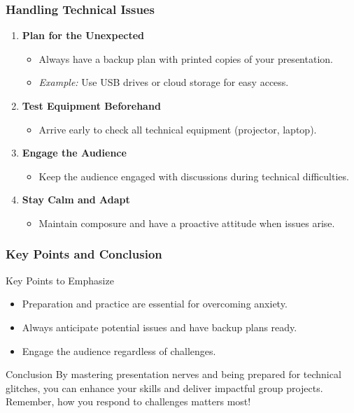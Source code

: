 \documentclass{beamer}
\begin{document}
\begin{frame}[fragile]
    \frametitle{Handling Technical Issues}
    \begin{enumerate}
        \item \textbf{Plan for the Unexpected}
        \begin{itemize}
            \item Always have a backup plan with printed copies of your presentation.
            \item \textit{Example:} Use USB drives or cloud storage for easy access.
        \end{itemize}

        \item \textbf{Test Equipment Beforehand}
        \begin{itemize}
            \item Arrive early to check all technical equipment (projector, laptop).
        \end{itemize}

        \item \textbf{Engage the Audience}
        \begin{itemize}
            \item Keep the audience engaged with discussions during technical difficulties.
        \end{itemize}

        \item \textbf{Stay Calm and Adapt}
        \begin{itemize}
            \item Maintain composure and have a proactive attitude when issues arise.
        \end{itemize}
    \end{enumerate}
\end{frame}

\begin{frame}[fragile]
    \frametitle{Key Points and Conclusion}
    \begin{block}{Key Points to Emphasize}
        \begin{itemize}
            \item Preparation and practice are essential for overcoming anxiety.
            \item Always anticipate potential issues and have backup plans ready.
            \item Engage the audience regardless of challenges.
        \end{itemize}
    \end{block}
    
    \begin{block}{Conclusion}
        By mastering presentation nerves and being prepared for technical glitches, you can enhance your skills and deliver impactful group projects. Remember, how you respond to challenges matters most!
    \end{block}
\end{frame}
\end{document}
